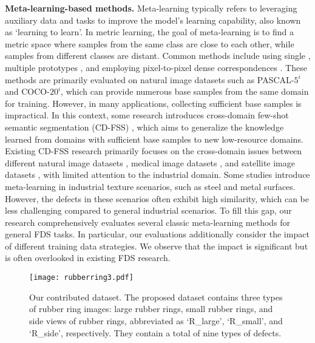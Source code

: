 \noindent \textbf{Meta-learning-based methods.} Meta-learning typically refers to leveraging auxiliary data and tasks to improve the model's learning capability, also known as `learning to learn'. In metric learning, the goal of meta-learning is to find a metric space where samples from the same class are close to each other, while samples from different classes are distant. Common methods include using single \cite{dong2018few,fan2022self,tian2020prior}, multiple prototypes \cite{li2021adaptive}, and employing pixel-to-pixel dense correspondences \cite{min2021hypercorrelation}. These methods are primarily evaluated on natural image datasets such as PASCAL-$5^i$ and COCO-$20^i$, which can provide numerous base samples from the same domain for training. However, in many applications, collecting sufficient base samples is impractical. In this context, some research introduces cross-domain few-shot semantic segmentation (CD-FSS) \cite{guo2020broader, lei2022cross}, which aims to generalize the knowledge learned from domains with sufficient base samples to new low-resource domains. Existing CD-FSS research primarily focuses on the cross-domain issues between different natural image datasets \cite{li2020fss}, medical image datasets \cite{candemir2013lung,jaeger2013automatic}, and satellite image datasets \cite{demir2018deepglobe}, with limited attention to the industrial domain. Some studies \cite{bao2021triplet,yu2022selective,yao2024few} introduce meta-learning in industrial texture scenarios, such as steel and metal surfaces. However, the defects in these scenarios often exhibit high similarity, which can be less challenging compared to general industrial scenarios. To fill this gap, our research comprehensively evaluates several classic meta-learning methods for general FDS tasks. In particular, our evaluations additionally consider the impact of different training data strategies. We observe that the impact is significant but is often overlooked in existing FDS research.


\begin{figure*}[tbp]
    \centering
    \texttt{[image: rubberring3.pdf]}
	\caption{Our contributed dataset. The proposed dataset contains three types of rubber ring images: large rubber rings, small rubber rings, and side views of rubber rings, abbreviated as `R\_large', `R\_small', and `R\_side', respectively. They contain a total of nine types of defects.}
	\label{rubberring_dataset}
\end{figure*}


